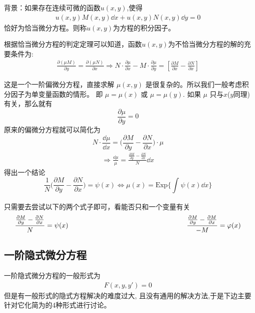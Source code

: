 \vspace*{2em}

背景：如果存在连续可微的函数$u(x, y)$,使得 
\begin{align*}
    u(x, y)M(x, y)\dd x + u(x, y)N(x, y)\dd y = 0
\end{align*}
恰好为恰当微分方程。则称$u(x, y)$为方程的积分因子。

根据恰当微分方程的判定定理可以知道，函数$u(x, y)$为不恰当微分方程的解的\textsf{充要条件}为:
\begin{align*}
    \frac{\partial (\mu M)}{\partial y}=\frac{\partial (\mu N)}{\partial x} 
    \Longrightarrow  
    N  \cdot \frac{\partial \mu}{\partial x}-M\cdot \frac{\partial \mu}{\partial y} = [\frac{\partial M}{\partial x} - \frac{\partial N}{\partial x}]
\end{align*}

这是一个一阶偏微分方程，直接求解 $\mu(x, y)$ 是很复杂的。所以我们一般考虑积分因子为单变量函数的情形。
即  $\mu= \mu(x)$ 或 $\mu = \mu(y)$. 如果 $\mu$ 只与$x$($y$同理)有关，那么就有
\[
    \frac{\partial \mu}{\partial y} = 0    
\]
原来的偏微分方程就可以简化为
\[
    N\cdot \frac{\dd\mu}{\dd x} = \biggl(\frac{\partial M}{\partial y}-\frac{\partial N}{\partial x}\biggr)\cdot\mu    
\]
\begin{align*}
    \Longrightarrow \frac{\dd\mu}{\mu} = \frac{\frac{\partial M}{\partial y}-\frac{\partial N}{\partial x}}{N}\dd x
\end{align*}
得出一个结论
\[
    \frac{1}{N} \biggl(\frac{\partial M}{\partial y}-\frac{\partial N}{\partial x}\biggr) = \psi(x) 
    \Longleftrightarrow 
    \mu (x) = \mathrm{Exp}\{\int_{}^{}{\psi (x) \dd x}\}   
\]

\bigskip
\begin{corollary}[寻找积分因子] 
只需要去尝试以下的两个式子即可，看能否只和一个变量有关
\begin{align}
    \frac{\frac{\partial M}{\partial y}-\frac{\partial N}{\partial x}}{N}=\psi(x) \hspace*{0.5\linewidth} \frac{\frac{\partial M}{\partial y}-\frac{\partial M}{\partial x}}{-M}=\varphi(x)
\end{align} 
\end{corollary}



\clearpage
\subsection{一阶隐式微分方程}
一阶隐式微分方程的一般形式为
\begin{align}
    F(x, y, y') = 0\nonumber
\end{align}
但是有一般形式的隐式方程解决的难度过大, 且没有通用的解决方法,于是下边主要针对它化简为的4种形式进行讨论。

